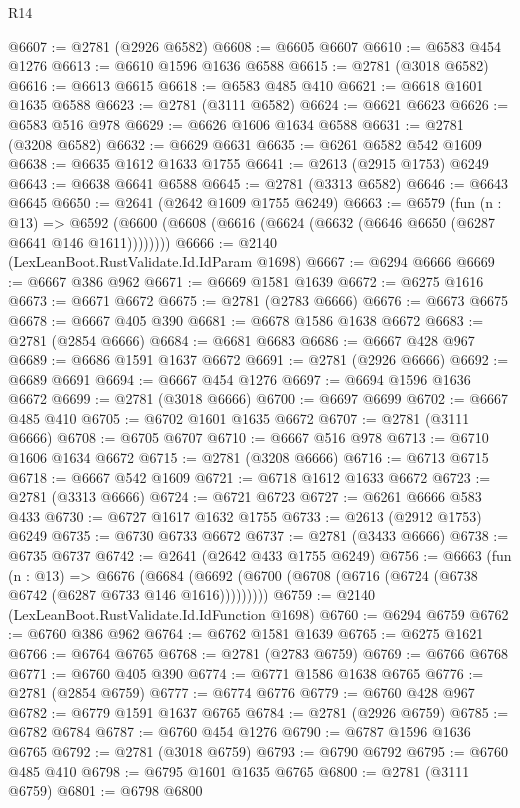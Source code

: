\begin{lexlean}{R14}
\begin{coremodule}
@6607 := @2781 (@2926 @6582)
@6608 := @6605 @6607
@6610 := @6583 @454 @1276
@6613 := @6610 @1596 @1636 @6588
@6615 := @2781 (@3018 @6582)
@6616 := @6613 @6615
@6618 := @6583 @485 @410
@6621 := @6618 @1601 @1635 @6588
@6623 := @2781 (@3111 @6582)
@6624 := @6621 @6623
@6626 := @6583 @516 @978
@6629 := @6626 @1606 @1634 @6588
@6631 := @2781 (@3208 @6582)
@6632 := @6629 @6631
@6635 := @6261 @6582 @542 @1609
@6638 := @6635 @1612 @1633 @1755
@6641 := @2613 (@2915 @1753) @6249
@6643 := @6638 @6641 @6588
@6645 := @2781 (@3313 @6582)
@6646 := @6643 @6645
@6650 := @2641 (@2642 @1609 @1755 @6249)
@6663 := @6579
    (fun (n : @13) =>
    @6592 (@6600 (@6608 (@6616 (@6624 (@6632 (@6646 @6650 (@6287 @6641 @146 @1611))))))))
@6666 := @2140 (LexLeanBoot.RustValidate.Id.IdParam @1698)
@6667 := @6294 @6666
@6669 := @6667 @386 @962
@6671 := @6669 @1581 @1639
@6672 := @6275 @1616
@6673 := @6671 @6672
@6675 := @2781 (@2783 @6666)
@6676 := @6673 @6675
@6678 := @6667 @405 @390
@6681 := @6678 @1586 @1638 @6672
@6683 := @2781 (@2854 @6666)
@6684 := @6681 @6683
@6686 := @6667 @428 @967
@6689 := @6686 @1591 @1637 @6672
@6691 := @2781 (@2926 @6666)
@6692 := @6689 @6691
@6694 := @6667 @454 @1276
@6697 := @6694 @1596 @1636 @6672
@6699 := @2781 (@3018 @6666)
@6700 := @6697 @6699
@6702 := @6667 @485 @410
@6705 := @6702 @1601 @1635 @6672
@6707 := @2781 (@3111 @6666)
@6708 := @6705 @6707
@6710 := @6667 @516 @978
@6713 := @6710 @1606 @1634 @6672
@6715 := @2781 (@3208 @6666)
@6716 := @6713 @6715
@6718 := @6667 @542 @1609
@6721 := @6718 @1612 @1633 @6672
@6723 := @2781 (@3313 @6666)
@6724 := @6721 @6723
@6727 := @6261 @6666 @583 @433
@6730 := @6727 @1617 @1632 @1755
@6733 := @2613 (@2912 @1753) @6249
@6735 := @6730 @6733 @6672
@6737 := @2781 (@3433 @6666)
@6738 := @6735 @6737
@6742 := @2641 (@2642 @433 @1755 @6249)
@6756 := @6663
    (fun (n : @13) =>
    @6676 (@6684 (@6692 (@6700 (@6708 (@6716 (@6724 (@6738 @6742 (@6287 @6733 @146 @1616)))))))))
@6759 := @2140 (LexLeanBoot.RustValidate.Id.IdFunction @1698)
@6760 := @6294 @6759
@6762 := @6760 @386 @962
@6764 := @6762 @1581 @1639
@6765 := @6275 @1621
@6766 := @6764 @6765
@6768 := @2781 (@2783 @6759)
@6769 := @6766 @6768
@6771 := @6760 @405 @390
@6774 := @6771 @1586 @1638 @6765
@6776 := @2781 (@2854 @6759)
@6777 := @6774 @6776
@6779 := @6760 @428 @967
@6782 := @6779 @1591 @1637 @6765
@6784 := @2781 (@2926 @6759)
@6785 := @6782 @6784
@6787 := @6760 @454 @1276
@6790 := @6787 @1596 @1636 @6765
@6792 := @2781 (@3018 @6759)
@6793 := @6790 @6792
@6795 := @6760 @485 @410
@6798 := @6795 @1601 @1635 @6765
@6800 := @2781 (@3111 @6759)
@6801 := @6798 @6800

\end{coremodule}
\end{lexlean}
